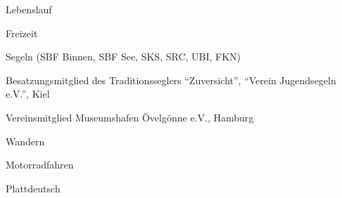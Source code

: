 \documentclass[11pt,a4paper]{scrartcl}
\begin{document}
\begin{cv}{Lebenslauf}
\begin{cvlist}{Freizeit}
\item Segeln (SBF Binnen, SBF See, SKS, SRC, UBI, FKN)
\item Besatzungsmitglied des Traditionsseglers "`Zuversicht"', "`Verein
Jugendsegeln e.V."', Kiel
\item Vereinsmitglied Museumshafen \"Ovelg\"onne e.V., Hamburg
\item Wandern
\item Motorradfahren
\item Plattdeutsch
\end{cvlist}


\date{26.~Juli~2014}

\end{cv}

\newpage
\end{document}
